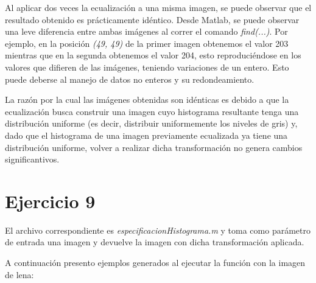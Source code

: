 \documentclass{article}
\begin{document}
Al aplicar dos veces la ecualización a una misma imagen, se puede observar que el resultado obtenido es prácticamente idéntico. Desde Matlab, se puede observar una leve diferencia entre ambas imágenes al correr el comando \textit{find(...)}. Por ejemplo, en la posición \textit{(49, 49)} de la primer imagen obtenemos el valor 203 mientras que en la segunda obtenemos el valor 204, esto reproduciéndose en los valores que difieren de las imágenes, teniendo variaciones de un entero. Esto puede deberse al manejo de datos no enteros y su redondeamiento. 

La razón por la cual las imágenes obtenidas son idénticas es debido a que la ecualización busca construir una imagen cuyo histograma resultante tenga una distribución uniforme (es decir, distribuir uniformemente los niveles de gris) y, dado que el histograma de una imagen previamente ecualizada ya tiene una distribución uniforme, volver a realizar dicha transformación no genera cambios significantivos. 

\section*{Ejercicio 9}
El archivo correspondiente es \textit{especificacionHistograma.m} y toma como parámetro de entrada una imagen y devuelve la imagen con dicha transformación aplicada.

A continuación presento ejemplos generados al ejecutar la función con la imagen de lena:
\end{document}
